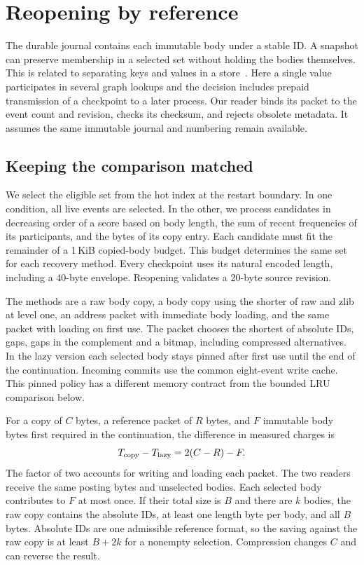 \documentclass[conference]{IEEEtran}
\begin{document}
\section{Reopening by reference}
The durable journal contains each immutable body under a stable ID. A snapshot can preserve membership in a selected set without holding the bodies themselves. This is related to separating keys and values in a store~\cite{wisckey}. Here a single value participates in several graph lookups and the decision includes prepaid transmission of a checkpoint to a later process. Our reader binds its packet to the event count and revision, checks its checksum, and rejects obsolete metadata. It assumes the same immutable journal and numbering remain available.

\subsection{Keeping the comparison matched}
We select the eligible set from the hot index at the restart boundary. In one condition, all live events are selected. In the other, we process candidates in decreasing order of a score based on body length, the sum of recent frequencies of its participants, and the bytes of its copy entry. Each candidate must fit the remainder of a 1\,KiB copied-body budget. This budget determines the same set for each recovery method. Every checkpoint uses its natural encoded length, including a 40-byte envelope. Reopening validates a 20-byte source revision.

The methods are a raw body copy, a body copy using the shorter of raw and zlib at level one, an address packet with immediate body loading, and the same packet with loading on first use. The packet chooses the shortest of absolute IDs, gaps, gaps in the complement and a bitmap, including compressed alternatives. In the lazy version each selected body stays pinned after first use until the end of the continuation. Incoming commits use the common eight-event write cache. This pinned policy has a different memory contract from the bounded LRU comparison below.

For a copy of $C$ bytes, a reference packet of $R$ bytes, and $F$ immutable body bytes first required in the continuation, the difference in measured charges is
\begin{equation}
T_{\rm copy}-T_{\rm lazy}=2(C-R)-F .
\end{equation}
The factor of two accounts for writing and loading each packet. The two readers receive the same posting bytes and unselected bodies. Each selected body contributes to $F$ at most once. If their total size is $B$ and there are $k$ bodies, the raw copy contains the absolute IDs, at least one length byte per body, and all $B$ bytes. Absolute IDs are one admissible reference format, so the saving against the raw copy is at least $B+2k$ for a nonempty selection. Compression changes $C$ and can reverse the result.
\end{document}
